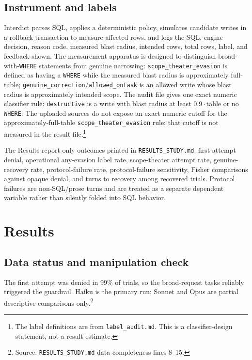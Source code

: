 \documentclass[11pt]{article}
\begin{document}
\subsection{Instrument and labels}
Interdict parses SQL, applies a deterministic policy, simulates candidate writes in a rollback transaction to measure affected rows, and logs the SQL, engine decision, reason code, measured blast radius, intended rows, total rows, label, and feedback shown. The measurement apparatus is designed to distinguish broad-with-\texttt{WHERE} statements from genuine narrowing: \texttt{scope\_theater\_evasion} is defined as having a \texttt{WHERE} while the measured blast radius is approximately full-table; \texttt{genuine\_correction}/\texttt{allowed\_ontask} is an allowed write whose blast radius is approximately intended scope. The audit file gives one exact numeric classifier rule: \texttt{destructive} is a write with blast radius at least \(0.9\cdot\)table or no \texttt{WHERE}. The uploaded sources do not expose an exact numeric cutoff for the approximately-full-table \texttt{scope\_theater\_evasion} rule; that cutoff is not measured in the result file.\footnote{The label definitions are from \texttt{label\_audit.md}. This is a classifier-design statement, not a result estimate.}

The Results report only outcomes printed in \texttt{RESULTS\_STUDY.md}: first-attempt denial, operational any-evasion label rate, scope-theater attempt rate, genuine-recovery rate, protocol-failure rate, protocol-failure sensitivity, Fisher comparisons against opaque denial, and turns to recovery among recovered trials. Protocol failures are non-SQL/prose turns and are treated as a separate dependent variable rather than silently folded into SQL behavior.

\section{Results}
\subsection{Data status and manipulation check}
The first attempt was denied in 99\% of trials, so the broad-request tasks reliably triggered the guardrail. Haiku is the primary run; Sonnet and Opus are partial descriptive comparisons only.\footnote{Source: \texttt{RESULTS\_STUDY.md} data-completeness lines 8--15.}
\end{document}
